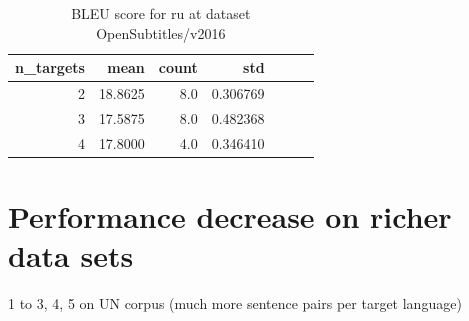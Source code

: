 \begin{table}[h]
\centering
\begin{tabular}{rrrrrrr}
\toprule
n\_targets & mean & count & std \\
\midrule
        2 &     18.8625 &    8.0 &  0.306769 \\
        3 &     17.5875 &    8.0 &  0.482368 \\
        4 &     17.8000 &    4.0 &  0.346410 \\
\bottomrule
\end{tabular}

\caption{BLEU score for  ru at dataset OpenSubtitles/v2016 }
\label{ table:ru/OpenSubtitles/v2016 }
\end{table}

\section{Performance decrease on richer data sets}
1 to 3, 4, 5 on UN corpus (much more sentence pairs per target language)


